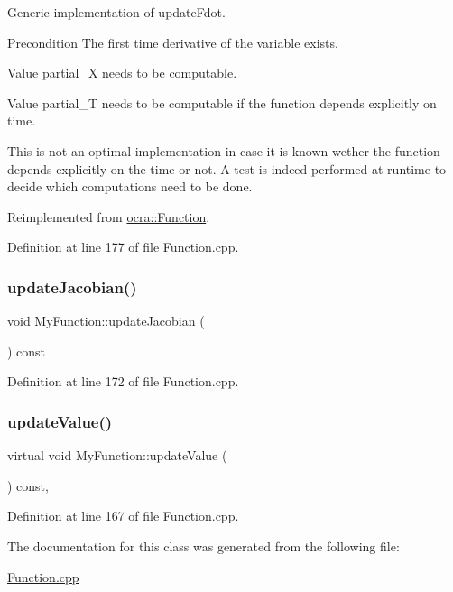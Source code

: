 Generic implementation of update\+Fdot.

\begin{DoxyPrecond}{Precondition}
The first time derivative of the variable exists. 

Value partial\+\_\+X needs to be computable. 

Value partial\+\_\+T needs to be computable if the function depends explicitly on time.
\end{DoxyPrecond}
This is not an optimal implementation in case it is known wether the function depends explicitly on the time or not. A test is indeed performed at runtime to decide which computations need to be done. 

Reimplemented from \hyperlink{classocra_1_1Function_a2f09ce859333f22fdd527ff08aee6e6e}{ocra\+::\+Function}.



Definition at line 177 of file Function.\+cpp.

\hypertarget{classMyFunction_a5ff3f1717385a96fe60fb1b993db0ef3}{}\label{classMyFunction_a5ff3f1717385a96fe60fb1b993db0ef3} 
\subsubsection{\texorpdfstring{update\+Jacobian()}{updateJacobian()}}
{\footnotesize\ttfamily void My\+Function\+::update\+Jacobian (\begin{DoxyParamCaption}{ }\end{DoxyParamCaption}) const\hspace{0.3cm}{\ttfamily [inline]}}



Definition at line 172 of file Function.\+cpp.

\hypertarget{classMyFunction_a53829722ebc3fce3d1fa9b96c61b2b53}{}\label{classMyFunction_a53829722ebc3fce3d1fa9b96c61b2b53} 
\subsubsection{\texorpdfstring{update\+Value()}{updateValue()}}
{\footnotesize\ttfamily virtual void My\+Function\+::update\+Value (\begin{DoxyParamCaption}{ }\end{DoxyParamCaption}) const\hspace{0.3cm}{\ttfamily [inline]}, {\ttfamily [virtual]}}



Definition at line 167 of file Function.\+cpp.



The documentation for this class was generated from the following file\+:\begin{DoxyCompactItemize}
\item 
\hyperlink{Function_8cpp}{Function.\+cpp}\end{DoxyCompactItemize}
